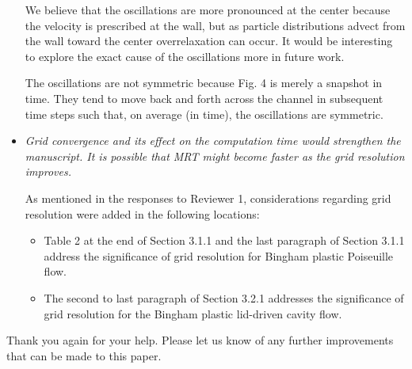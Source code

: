 \documentclass{article}
\begin{document}
\begin{itemize}
	We believe that the oscillations are more pronounced at the center because the velocity is prescribed at the wall, but as particle distributions advect from the wall toward the center overrelaxation can occur. It would be interesting to explore the exact cause of the oscillations more in future work.
	
	The oscillations are not symmetric because Fig. 4 is merely a snapshot in time. They tend to move back and forth across the channel in subsequent time steps such that, on average (in time), the oscillations are symmetric.
	
	\item \emph{Grid convergence and its effect on the computation time would strengthen the manuscript. It is possible that MRT might become faster as the grid resolution improves.}
	
	As mentioned in the responses to Reviewer 1, considerations regarding grid resolution were added in the following locations:
	\begin{itemize}
		\item Table 2 at the end of Section 3.1.1 and the last paragraph of Section 3.1.1 address the significance of grid resolution for Bingham plastic Poiseuille flow.
		\item The second to last paragraph of Section 3.2.1 addresses the significance of grid resolution for the Bingham plastic lid-driven cavity flow.
	\end{itemize}
	
	\end{itemize}

Thank you again for your help. Please let us know of any further improvements that can be made to this paper.
	
\end{document}
